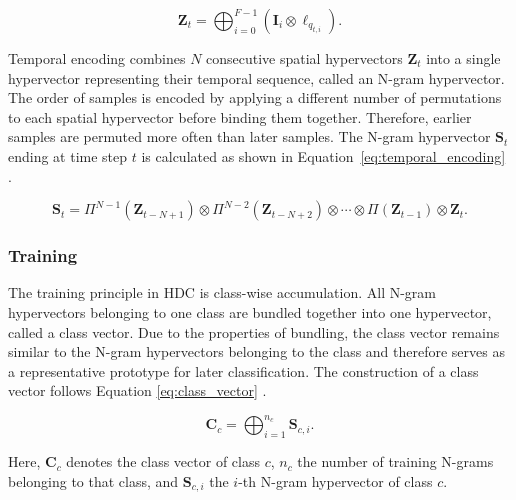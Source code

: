         \begin{equation}
            \mathbf{Z}_t
            =
            \bigoplus_{i=0}^{F-1}
            \left(
                \mathbf{I}_i
                \otimes
                \boldsymbol{\ell}_{q_{t,i}}
            \right).
            \label{eq:spatial_encoding}
        \end{equation}

    Temporal encoding combines $N$ consecutive spatial hypervectors $\mathbf{Z}_t$ into a single hypervector representing their temporal sequence, called an N-gram hypervector. The order of samples is encoded by applying a different number of permutations to each spatial hypervector before binding them together. Therefore, earlier samples are permuted more often than later samples. The N-gram hypervector $\mathbf{S}_t$ ending at time step $t$ is calculated as shown in Equation~\ref{eq:temporal_encoding} \cite{rahimi_hyperdimensional_2016}.

        \begin{equation}
        \mathbf{S}_t
        =
        \Pi^{N-1}\!\left(\mathbf{Z}_{t-N+1}\right)
        \otimes
        \Pi^{N-2}\!\left(\mathbf{Z}_{t-N+2}\right)
        \otimes
        \cdots
        \otimes
        \Pi\!\left(\mathbf{Z}_{t-1}\right)
        \otimes
        \mathbf{Z}_t.
        \label{eq:temporal_encoding}
        \end{equation}
    
    \subsubsection{Training}
    The training principle in HDC is class-wise accumulation. All N-gram hypervectors belonging to one class are bundled together into one hypervector, called a class vector. Due to the properties of bundling, the class vector remains similar to the N-gram hypervectors belonging to the class and therefore serves as a representative prototype for later classification. The construction of a class vector follows Equation \ref{eq:class_vector} \cite{thomas_theoretical_2021}.
    
        \begin{equation}
            \mathbf{C}_c
            =
            \bigoplus_{i=1}^{n_c}
            \mathbf{S}_{c,i}.
            \label{eq:class_vector}
        \end{equation}
    
    Here, $\mathbf{C}_c$ denotes the class vector of class $c$, $n_c$ the number of training N-grams belonging to that class, and $\mathbf{S}_{c,i}$ the $i$-th N-gram hypervector of class $c$.
    
